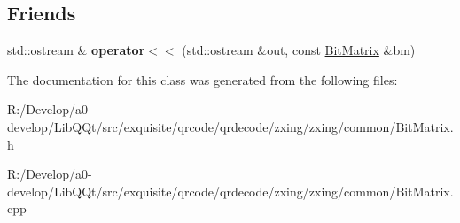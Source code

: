 \subsection*{Friends}
\begin{DoxyCompactItemize}
\item 
\mbox{\label{classzxing_1_1_bit_matrix_a3e3ad277c071f2fa7c9116b145cd93c8}} 
std\+::ostream \& {\bfseries operator$<$$<$} (std\+::ostream \&out, const \mbox{\hyperlink{classzxing_1_1_bit_matrix}{Bit\+Matrix}} \&bm)
\end{DoxyCompactItemize}


The documentation for this class was generated from the following files\+:\begin{DoxyCompactItemize}
\item 
R\+:/\+Develop/a0-\/develop/\+Lib\+Q\+Qt/src/exquisite/qrcode/qrdecode/zxing/zxing/common/Bit\+Matrix.\+h\item 
R\+:/\+Develop/a0-\/develop/\+Lib\+Q\+Qt/src/exquisite/qrcode/qrdecode/zxing/zxing/common/Bit\+Matrix.\+cpp\end{DoxyCompactItemize}
